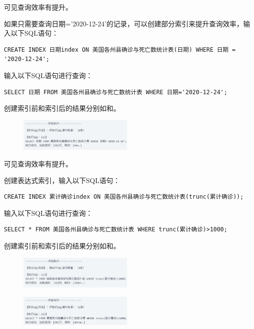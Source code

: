 \documentclass[lang=cn,11pt,a4paper,cite=authornum]{paper}
\begin{document}
可见查询效率有提升。

如果只需要查询日期='2020-12-24'的记录，可以创建部分索引来提升查询效率，输入以下SQL语句：
\begin{code}
\begin{verbatim}
CREATE INDEX 日期index ON 美国各州县确诊与死亡数统计表(日期) WHERE 日期 = '2020-12-24';
\end{verbatim}
\end{code}

输入以下SQL语句进行查询：
\begin{code}
\begin{verbatim}
SELECT 日期 FROM 美国各州县确诊与死亡数统计表 WHERE 日期='2020-12-24';
\end{verbatim}
\end{code}

创建索引前和索引后的结果分别如和。
\begin{figure}[!htb]
    \centering
    \includegraphics[width=0.5\textwidth]{./images/res18.png}
    \caption{\label{fig:res18}}
\end{figure}

可见查询效率有提升。

创建表达式索引，输入以下SQL语句：
\begin{code}
\begin{verbatim}
CREATE INDEX 累计确诊index ON 美国各州县确诊与死亡数统计表(trunc(累计确诊));
\end{verbatim}
\end{code}

输入以下SQL语句进行查询：
\begin{code}
\begin{verbatim}
SELECT * FROM 美国各州县确诊与死亡数统计表 WHERE trunc(累计确诊)>1000;
\end{verbatim}
\end{code}

创建索引前和索引后的结果分别如和。
\begin{figure}[!htb]
    \centering
    \includegraphics[width=0.5\textwidth]{./images/res19.png}
    \caption{\label{fig:res19}}
\end{figure}
\begin{figure}[!htb]
    \centering
    \includegraphics[width=0.5\textwidth]{./images/res20.png}
    \caption{\label{fig:res20}}
\end{figure}
\end{document}

